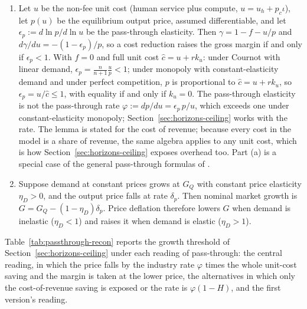 \begin{lemma}\label{lem:prices}
\begin{enumerate}
\item[(a)] Let $u$ be the non-fee unit cost (human service plus compute, $u=u_h+p_c\iota$), let $p(u)$ be the equilibrium output price, assumed differentiable, and let $\epsilon_p:=d\ln p/d\ln u$ be the pass-through elasticity. Then $\gamma=1-f-u/p$ and $d\gamma/du=-(1-\epsilon_p)/p$, so a cost reduction raises the gross margin if and only if $\epsilon_p<1$. With $f=0$ and full unit cost $\hat c=u+rk_u$: under Cournot with linear demand, $\epsilon_p=\tfrac{n}{n+1}\tfrac{u}{p}<1$; under monopoly with constant-elasticity demand and under perfect competition, $p$ is proportional to $\hat c=u+rk_u$, so $\epsilon_p=u/\hat c\le 1$, with equality if and only if $k_u=0$. The pass-through elasticity is not the pass-through rate $\varphi:=dp/du=\epsilon_p\,p/u$, which exceeds one under constant-elasticity monopoly; Section~\ref{sec:horizons-ceiling} works with the rate. The lemma is stated for the cost of revenue; because every cost in the model is a share of revenue, the same algebra applies to any unit cost, which is how Section~\ref{sec:horizons-ceiling} exposes overhead too.
Part (a) is a special case of the general pass-through formulas of \citet{weyl2013pass}.
\item[(b)] Suppose demand at constant prices grows at $G_Q$ with constant price elasticity $\eta_D>0$, and the output price falls at rate $\delta_p$. Then nominal market growth is $G=G_Q-(1-\eta_D)\delta_p$. Price deflation therefore lowers $G$ when demand is inelastic ($\eta_D<1$) and raises it when demand is elastic ($\eta_D>1$).
\end{enumerate}
\end{lemma}

Table~\ref{tab:passthrough-recon} reports the growth threshold of Section~\ref{sec:horizons-ceiling} under each reading of pass-through: the central reading, in which the price falls by the industry rate $\varphi$ times the whole unit-cost saving and the margin is taken at the lower price, the alternatives in which only the cost-of-revenue saving is exposed or the rate is $\varphi(1-H)$, and the first version's reading.


